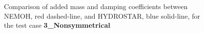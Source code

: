 \documentclass[12pt,a4paper,titlepage]{article}
\begin{document}
\begin{itemize}
\begin{figure}[h!tbp]
\centering
{}
\caption{Comparison of added mass and damping coefficients between NEMOH, red dashed-line, and HYDROSTAR, blue solid-line, for the test case \textbf{3\_Nonsymmetrical}}\label{fig:NonSymmetrical_massdamp}
\end{figure}


\end{itemize}
\end{document}
